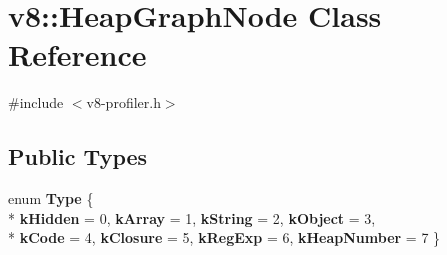 \hypertarget{classv8_1_1_heap_graph_node}{}\section{v8\+:\+:Heap\+Graph\+Node Class Reference}
\label{classv8_1_1_heap_graph_node}


{\ttfamily \#include $<$v8-\/profiler.\+h$>$}

\subsection*{Public Types}
\begin{DoxyCompactItemize}
\item 
\hypertarget{classv8_1_1_heap_graph_node_ab674a58103a51abc56f99edc6a1479ed}{}enum {\bfseries Type} \{ \\*
{\bfseries k\+Hidden} = 0, 
{\bfseries k\+Array} = 1, 
{\bfseries k\+String} = 2, 
{\bfseries k\+Object} = 3, 
\\*
{\bfseries k\+Code} = 4, 
{\bfseries k\+Closure} = 5, 
{\bfseries k\+Reg\+Exp} = 6, 
{\bfseries k\+Heap\+Number} = 7
 \}\label{classv8_1_1_heap_graph_node_ab674a58103a51abc56f99edc6a1479ed}

\end{DoxyCompactItemize}
